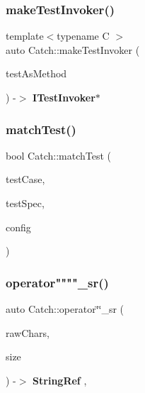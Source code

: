 \subsubsection{makeTestInvoker()\hspace{0.1cm}{\footnotesize\ttfamily [2/2]}}
{\footnotesize\ttfamily template$<$typename C $>$ \\
auto Catch\+::make\+Test\+Invoker (\begin{DoxyParamCaption}\item[{void(C\+::$\ast$)()}]{test\+As\+Method }\end{DoxyParamCaption}) -\/$>$ \textbf{ I\+Test\+Invoker}$\ast$ \hspace{0.3cm}{\ttfamily [noexcept]}}

\mbox{\label{namespace_catch_aadef80fbc6bc84589777a462770cef49}} 
\subsubsection{matchTest()}
{\footnotesize\ttfamily bool Catch\+::match\+Test (\begin{DoxyParamCaption}\item[{\textbf{ Test\+Case} const \&}]{test\+Case,  }\item[{Test\+Spec const \&}]{test\+Spec,  }\item[{\textbf{ I\+Config} const \&}]{config }\end{DoxyParamCaption})}

\mbox{\label{namespace_catch_a56dcfbb436fa40d778e784bf862e78a6}} 
\subsubsection{operator""""\_sr()}
{\footnotesize\ttfamily auto Catch\+::operator\char`\"{}\char`\"{}\+\_\+sr (\begin{DoxyParamCaption}\item[{char const $\ast$}]{raw\+Chars,  }\item[{std\+::size\+\_\+t}]{size }\end{DoxyParamCaption}) -\/$>$ \textbf{ String\+Ref} \hspace{0.3cm}{\ttfamily [inline]}, {\ttfamily [noexcept]}}

\mbox{\label{namespace_catch_a5e95b3c47a7618db3649dc39b0bb9004}} 

